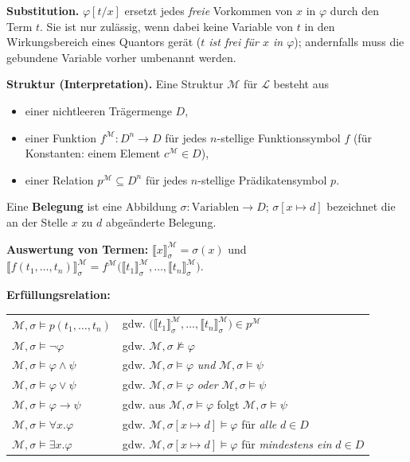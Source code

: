 \medskip
\noindent\textbf{Substitution.} $\varphi[t/x]$ ersetzt jedes \emph{freie} Vorkommen von $x$ in $\varphi$ durch den Term $t$. Sie ist nur zulässig, wenn dabei keine Variable von $t$ in den Wirkungsbereich eines Quantors gerät (\emph{$t$ ist frei für $x$ in $\varphi$}); andernfalls muss die gebundene Variable vorher umbenannt werden.

\medskip
\noindent\textbf{Struktur (Interpretation).} Eine Struktur $\mathcal{M}$ für $\mathscr{L}$ besteht aus
\begin{itemize}
  \item einer nichtleeren Trägermenge $D$,
  \item einer Funktion $f^{\mathcal{M}}:D^n\to D$ für jedes $n$-stellige Funktionssymbol $f$ (für Konstanten: einem Element $c^{\mathcal{M}}\in D$),
  \item einer Relation $p^{\mathcal{M}}\subseteq D^n$ für jedes $n$-stellige Prädikatensymbol $p$.
\end{itemize}
Eine \textbf{Belegung} ist eine Abbildung $\sigma:\text{Variablen}\to D$; $\sigma[x\mapsto d]$ bezeichnet die an der Stelle $x$ zu $d$ abgeänderte Belegung.

\medskip
\noindent\textbf{Auswertung von Termen:} $\llbracket x\rrbracket^{\mathcal{M}}_\sigma=\sigma(x)$ \quad und \quad $\llbracket f(t_1,\dots,t_n)\rrbracket^{\mathcal{M}}_\sigma=f^{\mathcal{M}}\big(\llbracket t_1\rrbracket^{\mathcal{M}}_\sigma,\dots,\llbracket t_n\rrbracket^{\mathcal{M}}_\sigma\big)$.

\medskip
\noindent\textbf{Erfüllungsrelation:}
\begin{center}
\renewcommand{\arraystretch}{1.35}
\begin{tabularx}{\textwidth}{l X}
$\mathcal{M},\sigma\models p(t_1,\dots,t_n)$ & gdw. $\big(\llbracket t_1\rrbracket^{\mathcal{M}}_\sigma,\dots,\llbracket t_n\rrbracket^{\mathcal{M}}_\sigma\big)\in p^{\mathcal{M}}$ \\
$\mathcal{M},\sigma\models\neg\varphi$ & gdw. $\mathcal{M},\sigma\not\models\varphi$ \\
$\mathcal{M},\sigma\models\varphi\wedge\psi$ & gdw. $\mathcal{M},\sigma\models\varphi$ \emph{und} $\mathcal{M},\sigma\models\psi$ \\
$\mathcal{M},\sigma\models\varphi\vee\psi$ & gdw. $\mathcal{M},\sigma\models\varphi$ \emph{oder} $\mathcal{M},\sigma\models\psi$ \\
$\mathcal{M},\sigma\models\varphi\to\psi$ & gdw. aus $\mathcal{M},\sigma\models\varphi$ folgt $\mathcal{M},\sigma\models\psi$ \\
$\mathcal{M},\sigma\models\forall x.\varphi$ & gdw. $\mathcal{M},\sigma[x\mapsto d]\models\varphi$ für \emph{alle} $d\in D$ \\
$\mathcal{M},\sigma\models\exists x.\varphi$ & gdw. $\mathcal{M},\sigma[x\mapsto d]\models\varphi$ für \emph{mindestens ein} $d\in D$ \\
\end{tabularx}
\end{center}

